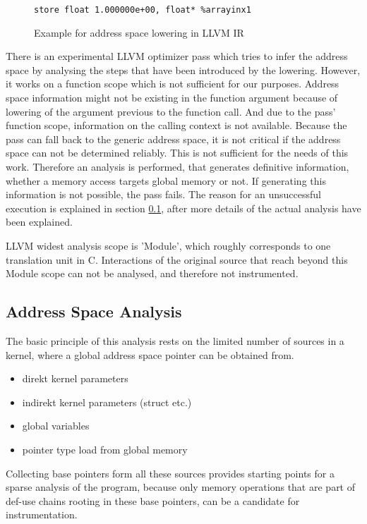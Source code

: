 \begin{figure}
	\begin{lstlisting}[style=C]
%arrayinx1 = getelementptr inbounds (float, float* addrspacecast (float addrspace(3)* @_ZZ5saxpyfPfS_iPlS0_E2_x to float*), i64 0, i64 2)
store float 1.000000e+00, float* %arrayinx1
	\end{lstlisting}
	\caption{Example for address space lowering in LLVM IR}
	\label{lowering}
\end{figure}

There is an experimental LLVM optimizer pass which tries to infer the address space by analysing the steps that have been introduced by the lowering. However, it works on a function scope which is not sufficient for our purposes. Address space information  might not be existing in the function argument because of lowering of the argument previous to the function call. And due to the pass' function scope, information on the calling context is not available. Because the pass can fall back to the generic address space,
it is not critical if the address space can not be determined reliably. This is not sufficient for the needs of this work.
Therefore an  analysis is performed, that generates definitive information, whether a memory access targets
global memory or not. If generating this information is not possible, the pass fails. The reason for an unsuccessful execution is  explained in section \ref{pa}, after more details of the actual analysis have been explained.

LLVM widest analysis scope is 'Module', which roughly corresponds to one translation unit in C. Interactions of the original source that reach beyond this Module scope can not be analysed, and therefore not instrumented.

\subsection{Address Space Analysis}\label{pa}
The basic principle of this analysis rests on the limited number of sources in 
a kernel, where a global address space pointer can be obtained from.
\begin{itemize}
	\item direkt kernel parameters
	\item indirekt kernel parameters (struct etc.)
	\item global variables
	\item pointer type load from global memory
\end{itemize}
Collecting base pointers form all these sources provides starting points for a sparse analysis of the program,
because only memory operations that are part of def-use chains rooting in these base pointers, can be a candidate for instrumentation.

